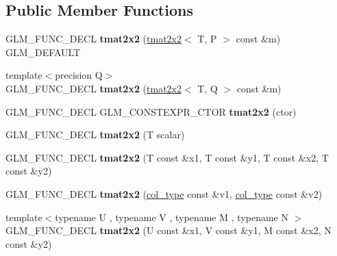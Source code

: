 \subsection*{Public Member Functions}
\begin{DoxyCompactItemize}
\item 
\mbox{\label{structglm_1_1tmat2x2_a35326be3558b276f538fe1968eb22df5}} 
G\+L\+M\+\_\+\+F\+U\+N\+C\+\_\+\+D\+E\+CL {\bfseries tmat2x2} (\hyperlink{structglm_1_1tmat2x2}{tmat2x2}$<$ T, P $>$ const \&m) G\+L\+M\+\_\+\+D\+E\+F\+A\+U\+LT
\item 
\mbox{\label{structglm_1_1tmat2x2_a2f3cdab306325bbc4b1e1c57eb3a203a}} 
{\footnotesize template$<$precision Q$>$ }\\G\+L\+M\+\_\+\+F\+U\+N\+C\+\_\+\+D\+E\+CL {\bfseries tmat2x2} (\hyperlink{structglm_1_1tmat2x2}{tmat2x2}$<$ T, Q $>$ const \&m)
\item 
\mbox{\label{structglm_1_1tmat2x2_aa94dafb83a5e771d080c54859cb80f51}} 
G\+L\+M\+\_\+\+F\+U\+N\+C\+\_\+\+D\+E\+CL G\+L\+M\+\_\+\+C\+O\+N\+S\+T\+E\+X\+P\+R\+\_\+\+C\+T\+OR {\bfseries tmat2x2} (ctor)
\item 
\mbox{\label{structglm_1_1tmat2x2_a83d1b6a2d8ed8b6ce0f8363b5dd2682f}} 
G\+L\+M\+\_\+\+F\+U\+N\+C\+\_\+\+D\+E\+CL {\bfseries tmat2x2} (T scalar)
\item 
\mbox{\label{structglm_1_1tmat2x2_ab7ee77d8b2dcae2fdcd50192ff34ab90}} 
G\+L\+M\+\_\+\+F\+U\+N\+C\+\_\+\+D\+E\+CL {\bfseries tmat2x2} (T const \&x1, T const \&y1, T const \&x2, T const \&y2)
\item 
\mbox{\label{structglm_1_1tmat2x2_a6b69a58d1a8d7856f47240557f0c8615}} 
G\+L\+M\+\_\+\+F\+U\+N\+C\+\_\+\+D\+E\+CL {\bfseries tmat2x2} (\hyperlink{structglm_1_1tvec2}{col\+\_\+type} const \&v1, \hyperlink{structglm_1_1tvec2}{col\+\_\+type} const \&v2)
\item 
\mbox{\label{structglm_1_1tmat2x2_aac710faffcebf55cc2120a98b4ab0373}} 
{\footnotesize template$<$typename U , typename V , typename M , typename N $>$ }\\G\+L\+M\+\_\+\+F\+U\+N\+C\+\_\+\+D\+E\+CL {\bfseries tmat2x2} (U const \&x1, V const \&y1, M const \&x2, N const \&y2)

\end{DoxyCompactItemize}

